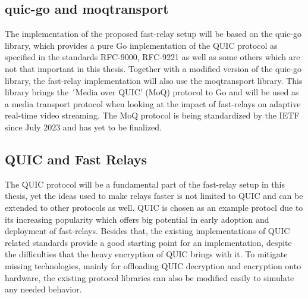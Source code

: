 \subsection{quic-go and moqtransport}
The implementation of the proposed fast-relay setup will be based on the quic-go library, which provides a
pure Go implementation of the QUIC protocol as specified in the standards RFC-9000, RFC-9221 as well as some
others which are not that important in this thesis. Together with a modified version of the quic-go library,
the fast-relay implementation will also use the moqtransport library.
This library brings the ´Media over QUIC' (MoQ) protocol to Go and will be used as a media transport protocol 
when looking at the impact of fast-relays on adaptive real-time video streaming.
The MoQ protocol is being standardized by the IETF since July 2023 and has yet to be finalized. 

\subsection{QUIC and Fast Relays}
The QUIC protocol will be a fundamental part of the fast-relay setup in this thesis, yet the ideas used 
to make relays faster is not limited to QUIC and can be extended to other protocols as well.
QUIC is chosen as an example protocl due to its increasing popularity which offers big potential 
in early adoption and deployment of fast-relays.
Besides that, the existing implementations of QUIC related standards provide a good starting point for
an implementation, despite the difficulties that the heavy encryption of QUIC brings with it.
To mitigate missing technologies, mainly for offloading QUIC decryption and encryption onto hardware,
the existing protocol libraries can also be modified easily to simulate any needed behavior.
